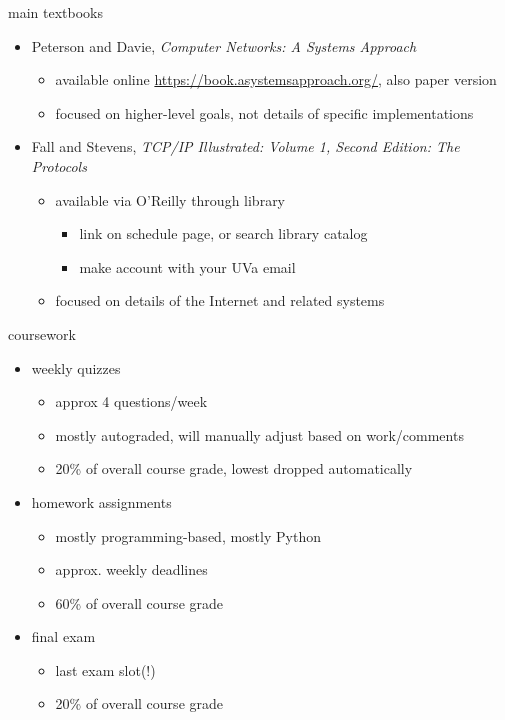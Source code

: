 
\begin{frame}{main textbooks}
    \begin{itemize}
    \item Peterson and Davie, \textit{Computer Networks:  A Systems Approach}
        \begin{itemize}
        \item available online \url{https://book.asystemsapproach.org/}, also paper version
        \item focused on higher-level goals, not details of specific implementations
        \end{itemize}
    \item Fall and Stevens, \textit{TCP/IP Illustrated: Volume 1, Second Edition: The Protocols}
        \begin{itemize}
        \item available via O'Reilly through library
            \begin{itemize}
            \item link on schedule page, or search library catalog
            \item make account with your UVa email
            \end{itemize}
        \item focused on details of the Internet and related systems
        \end{itemize}
    \end{itemize}
\end{frame}

\begin{frame}{coursework}
    \begin{itemize}
    \item weekly quizzes
        \begin{itemize}
        \item approx 4 questions/week
        \item mostly autograded, will manually adjust based on work/comments
        \item 20\% of overall course grade, lowest dropped automatically
        \end{itemize}
    \item homework assignments
        \begin{itemize}
        \item mostly programming-based, mostly Python
        \item approx. weekly deadlines
        \item 60\% of overall course grade
        \end{itemize}
    \item final exam
        \begin{itemize}
        \item last exam slot(!)
        \item 20\% of overall course grade
        \end{itemize}
    \end{itemize}
\end{frame}

